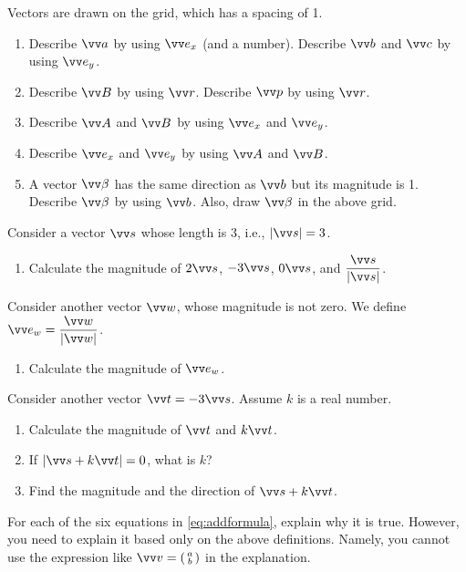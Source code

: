\documentclass[11pt,pdfa,lastpage]{MishoNote}
\begin{document}
\begin{problems}
 \Problem[S] Vectors are drawn on the grid, which has a spacing of 1.
 \par\smallskip\par\usebox{\VectorSetA}
 \begin{enumerate}
   \item Describe $\vc a$ by using $\vvex$ (and a number).  Describe $\vc b$ and $\vc c$ by using $\vvey$.
   \item Describe $\vc B$ by using $\vc r$. Describe $\vc p$ by using $\vc r$.
   \item Describe $\vc A$ and $\vc B$ by using $\vvex$ and $\vvey$.
   \item Describe $\vvex$ and $\vvey$ by using $\vc A$ and $\vc B$.
   \item A vector $\vc \beta$ has the same direction as $\vc b$ but its magnitude is 1. Describe $\vc \beta$ by using $\vc b$. Also, draw $\vc \beta$ in the above grid.
 \end{enumerate}
\end{problems}
\begin{problems}
 \Problem[S] Consider a vector $\vc s$ whose length is 3, i.e., $|\vc s|=3$.
 \begin{enumerate}
   \item Calculate the magnitude of $2\vc s$, $-3\vc s$, $0\vc s$, and $\dfrac{\vc s}{|\vc s|}$.
 \end{enumerate}
 Consider another vector $\vc w$, whose magnitude is not zero. We define $\vc{e_w}= \dfrac{\vc w}{|\vc w|}$.
 \begin{enumerate}[resume]
  \item Calculate the magnitude of $\vc{e_w}$.
 \end{enumerate}
Consider another vector $\vc t=-3\vc s$. Assume $k$ is a real number.
\begin{enumerate}[resume]
  \item Calculate the magnitude of $\vc t$ and $k\vc t$. 
  \item If $|\vc s+k\vc t|=0$, what is $k$?
  \item Find the magnitude and the direction of $\vc s+k\vc t$.
 \end{enumerate}
 \Problem[B] For each of the six equations in \eqref{eq:addformula}, explain why it is true. However, you need to explain it based only on the above definitions. Namely, you cannot use the expression like $\vc v=\spmat{a\\b}$ in the explanation.
\end{problems}
\end{document}
